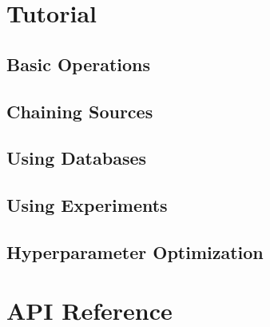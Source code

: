 \documentclass[letterpaper,10pt,english]{sphinxmanual}
\begin{document}
\begin{sphinxVerbatim}[commandchars=\\\{\}]
  
 
  
\end{sphinxVerbatim}


\section{Tutorial}
\label{\detokenize{Tutorial:tutorial}}\label{\detokenize{Tutorial::doc}}

\subsection{Basic Operations}
\label{\detokenize{Tutorial:basic-operations}}

\subsection{Chaining Sources}
\label{\detokenize{Tutorial:chaining-sources}}

\subsection{Using Databases}
\label{\detokenize{Tutorial:using-databases}}

\subsection{Using Experiments}
\label{\detokenize{Tutorial:using-experiments}}

\subsection{Hyperparameter Optimization}
\label{\detokenize{Tutorial:hyperparameter-optimization}}

\section{API Reference}
\label{\detokenize{Fireworks:api-reference}}\label{\detokenize{Fireworks::doc}}
\end{document}
